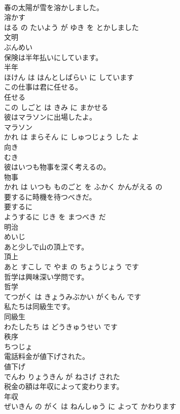 \documentclass[8pt]{extreport}
\begin{document}
\begin{CJK}{UTF8}{min}
\\	春の太陽が雪を溶かしました。	
\\	溶かす 
\\	はる の たいよう が ゆき を とかしました			
\\	文明	
\\	ぶんめい		
\\	保険は半年払いにしています。	
\\	半年 
\\	ほけん は はんとしばらい に しています			
\\	この仕事は君に任せる。	
\\	任せる 
\\	この しごと は きみ に まかせる			
\\	彼はマラソンに出場したよ。	
\\	マラソン 
\\	かれ は まらそん に しゅつじょう した よ			
\\	向き	
\\	むき		
\\	彼はいつも物事を深く考えるの。	
\\	物事 
\\	かれ は いつも ものごと を ふかく かんがえる の			
\\	要するに時機を待つべきだ。	
\\	要するに 
\\	ようするに じき を まつべき だ			
\\	明治	
\\	めいじ		
\\	あと少しで山の頂上です。	
\\	頂上 
\\	あと すこし で やま の ちょうじょう です			
\\	哲学は興味深い学問です。	
\\	哲学 
\\	てつがく は きょうみぶかい がくもん です			
\\	私たちは同級生です。	
\\	同級生 
\\	わたしたち は どうきゅうせい です			
\\	秩序	
\\	ちつじょ		
\\	電話料金が値下げされた。	
\\	値下げ 
\\	でんわ りょうきん が ねさげ された			
\\	税金の額は年収によって変わります。	
\\	年収 
\\	ぜいきん の がく は ねんしゅう に よって かわります			

\end{CJK}
\end{document}
